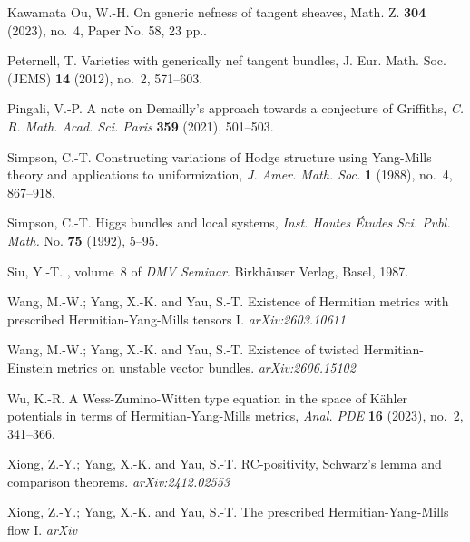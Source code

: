 \documentclass[12pt, reqno]{amsart}
\theoremstyle{plain}
\theoremstyle{definition}
\renewcommand{\>}{\rightarrow}
\renewcommand{\>}{\rightarrow}
\numberwithin{equation}{section} %
\begin{document}
\begin{thebibliography}{Kawamata}
Ou, W.-H.  On generic nefness of tangent sheaves, Math. Z. {\bf 304} (2023), no.~4, Paper No. 58, 23 pp..


Peternell, T. Varieties with generically nef tangent bundles, J. Eur. Math. Soc. (JEMS) {\bf 14} (2012), no.~2, 571--603.

    Pingali, V.-P.  A note on Demailly's approach towards a conjecture of Griffiths, \emph{C. R. Math. Acad. Sci. Paris }{\bf 359} (2021), 501--503.

     Simpson, C.-T.  Constructing variations of Hodge structure using Yang-Mills theory and applications to uniformization, \emph{J. Amer. Math. Soc.} {\textbf 1} (1988), no.~4, 867--918.

     Simpson, C.-T.  Higgs bundles and local systems,  \emph{Inst. Hautes \'Etudes Sci. Publ. Math.} No. \textbf{75} (1992), 5--95.





    Siu, Y.-T.
    , volume~8 of {\em DMV Seminar}.
    \newblock Birkh\"auser Verlag, Basel, 1987.











     Wang, M.-W.; Yang, X.-K. and Yau, S.-T. Existence of Hermitian metrics  with  prescribed Hermitian-Yang-Mills tensors  I.  \emph{arXiv:2603.10611}


     Wang, M.-W.; Yang, X.-K. and Yau, S.-T. Existence of  twisted Hermitian-Einstein metrics on unstable vector bundles.  \emph{arXiv:2606.15102}


    Wu, K.-R.  A Wess-Zumino-Witten type equation in the space of K\"ahler potentials in terms of Hermitian-Yang-Mills metrics,\emph{ Anal. PDE} {\bf 16} (2023), no.~2, 341--366.

     Xiong, Z.-Y.; Yang, X.-K. and  Yau, S.-T.
    RC-positivity, Schwarz's lemma and comparison theorems. \emph{arXiv:2412.02553}

     Xiong, Z.-Y.; Yang, X.-K. and  Yau, S.-T. The prescribed Hermitian-Yang-Mills flow I.  \emph{arXiv}



\end{thebibliography}
\end{document}
